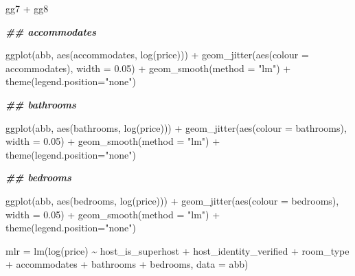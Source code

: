 \documentclass[
]{article}
\newenvironment{Shaded}{\begin{snugshade}}{\end{snugshade}}
\newcommand{\AttributeTok}[1]{\textcolor[rgb]{0.77,0.63,0.00}{#1}}
\newcommand{\DocumentationTok}[1]{\textcolor[rgb]{0.56,0.35,0.01}{\textbf{\textit{#1}}}}
\newcommand{\FloatTok}[1]{\textcolor[rgb]{0.00,0.00,0.81}{#1}}
\newcommand{\FunctionTok}[1]{\textcolor[rgb]{0.00,0.00,0.00}{#1}}
\newcommand{\NormalTok}[1]{#1}
\newcommand{\OtherTok}[1]{\textcolor[rgb]{0.56,0.35,0.01}{#1}}
\newcommand{\SpecialCharTok}[1]{\textcolor[rgb]{0.00,0.00,0.00}{#1}}
\newcommand{\StringTok}[1]{\textcolor[rgb]{0.31,0.60,0.02}{#1}}
\begin{document}
\begin{Shaded}
\begin{Highlighting}[]
\NormalTok{gg7 }\SpecialCharTok{+}\NormalTok{ gg8}

\DocumentationTok{\#\# accommodates}

\FunctionTok{ggplot}\NormalTok{(abb, }\FunctionTok{aes}\NormalTok{(accommodates, }\FunctionTok{log}\NormalTok{(price))) }\SpecialCharTok{+} 
  \FunctionTok{geom\_jitter}\NormalTok{(}\FunctionTok{aes}\NormalTok{(}\AttributeTok{colour =}\NormalTok{ accommodates), }\AttributeTok{width =} \FloatTok{0.05}\NormalTok{) }\SpecialCharTok{+}
  \FunctionTok{geom\_smooth}\NormalTok{(}\AttributeTok{method =} \StringTok{"lm"}\NormalTok{) }\SpecialCharTok{+}
  \FunctionTok{theme}\NormalTok{(}\AttributeTok{legend.position=}\StringTok{"none"}\NormalTok{)}

\DocumentationTok{\#\# bathrooms}

\FunctionTok{ggplot}\NormalTok{(abb, }\FunctionTok{aes}\NormalTok{(bathrooms, }\FunctionTok{log}\NormalTok{(price))) }\SpecialCharTok{+} 
  \FunctionTok{geom\_jitter}\NormalTok{(}\FunctionTok{aes}\NormalTok{(}\AttributeTok{colour =}\NormalTok{ bathrooms), }\AttributeTok{width =} \FloatTok{0.05}\NormalTok{) }\SpecialCharTok{+}
  \FunctionTok{geom\_smooth}\NormalTok{(}\AttributeTok{method =} \StringTok{"lm"}\NormalTok{) }\SpecialCharTok{+}
  \FunctionTok{theme}\NormalTok{(}\AttributeTok{legend.position=}\StringTok{"none"}\NormalTok{)}

\DocumentationTok{\#\# bedrooms}

\FunctionTok{ggplot}\NormalTok{(abb, }\FunctionTok{aes}\NormalTok{(bedrooms, }\FunctionTok{log}\NormalTok{(price))) }\SpecialCharTok{+} 
  \FunctionTok{geom\_jitter}\NormalTok{(}\FunctionTok{aes}\NormalTok{(}\AttributeTok{colour =}\NormalTok{ bedrooms), }\AttributeTok{width =} \FloatTok{0.05}\NormalTok{) }\SpecialCharTok{+}
  \FunctionTok{geom\_smooth}\NormalTok{(}\AttributeTok{method =} \StringTok{"lm"}\NormalTok{) }\SpecialCharTok{+}
  \FunctionTok{theme}\NormalTok{(}\AttributeTok{legend.position=}\StringTok{"none"}\NormalTok{)}

\NormalTok{mlr }\OtherTok{=} \FunctionTok{lm}\NormalTok{(}\FunctionTok{log}\NormalTok{(price) }\SpecialCharTok{\textasciitilde{}}\NormalTok{ host\_is\_superhost }\SpecialCharTok{+}\NormalTok{ host\_identity\_verified }\SpecialCharTok{+}\NormalTok{ room\_type }\SpecialCharTok{+}\NormalTok{ accommodates }\SpecialCharTok{+}\NormalTok{ bathrooms }\SpecialCharTok{+}\NormalTok{ bedrooms, }\AttributeTok{data =}\NormalTok{ abb)}


\end{Highlighting}
\end{Shaded}
\end{document}
